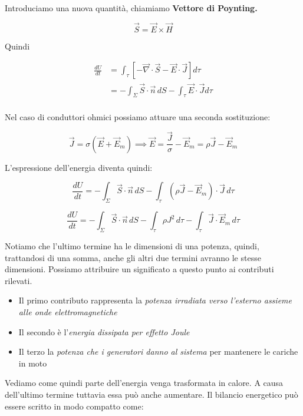 Introduciamo una nuova quantità, chiamiamo \textbf{Vettore di Poynting.}

\[
	\boxed{\vec{S} = \vec{E} \times \vec{H}}
\]

Quindi

\begin{equation*}
	\begin{aligned}
		\frac{dU}{dt} &= \int_{\tau} \left[ - \vec{\nabla} \cdot \vec{S} - \vec{E} \cdot \vec{J} \right] d\tau \\
		&= -\int_{\Sigma}\vec{S} \cdot \vec{n} \,dS - \int_{\tau}  \vec{E} \cdot \vec{J} d\tau \\
	\end{aligned}
\end{equation*}

Nel caso di conduttori ohmici possiamo attuare una seconda sostituzione:

\[
	\vec{J} = \sigma (\vec{E} + \vec{E}_m) \implies  \vec{E} = \frac{\vec{J}}{\sigma} - \vec{E}_m = \rho \vec{J} - \vec{E}_m
\]

L'espressione dell'energia diventa quindi:

\[
	\frac{dU}{dt} = -\int_{\Sigma}\vec{S} \cdot \vec{n} \,dS - \int_{\tau}  \left( \rho \vec{J} -\vec{E}_m  \right)   \cdot \vec{J} \, d\tau
\]

\[
	\boxed{\frac{dU}{dt} = -\int_{\Sigma}\vec{S} \cdot \vec{n} \,dS - \int_{\tau} \rho J^2 \, d\tau - \int_{\tau} \vec{J} \cdot \vec{E}_m \, d\tau}
\]

Notiamo che l'ultimo termine ha le dimensioni di una potenza, quindi, trattandosi di una somma, anche gli altri due termini avranno le stesse dimensioni. Possiamo attribuire un significato a questo punto ai contributi rilevati.

\begin{itemize}
	\item Il primo contributo rappresenta la \emph{potenza irradiata verso l'esterno assieme alle onde elettromagnetiche}
	\item Il secondo è l'\emph{energia dissipata per effetto Joule}
	\item Il terzo la \emph{potenza che i generatori danno al sistema} per mantenere le cariche in moto
\end{itemize}

Vediamo come quindi parte dell'energia venga trasformata in calore. A causa dell'ultimo termine tuttavia essa può anche aumentare.
Il bilancio energetico può essere scritto in modo compatto come:

